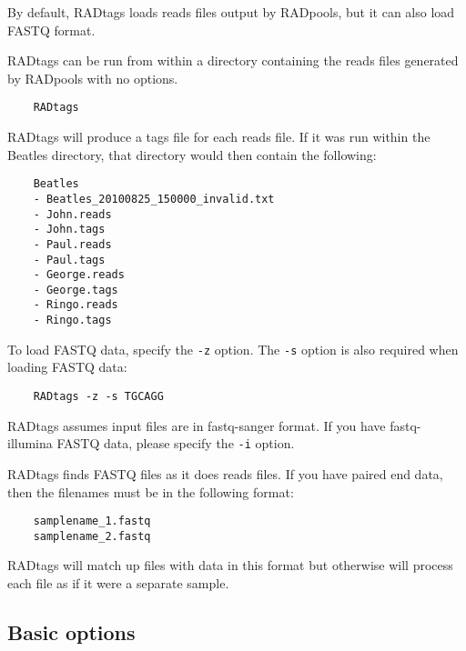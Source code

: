 \documentclass[a4paper]{article}
\begin{document}
By default, RADtags loads reads files output by RADpools, but it can also load FASTQ format.

RADtags can be run from within a directory containing the reads files generated by RADpools with no options.

\begin{verbatim}
    RADtags
\end{verbatim}

RADtags will produce a tags file for each reads file. If it was run within the Beatles directory, that directory would then contain the following:

\begin{verbatim}
    Beatles
    - Beatles_20100825_150000_invalid.txt
    - John.reads
    - John.tags
    - Paul.reads
    - Paul.tags
    - George.reads
    - George.tags
    - Ringo.reads
    - Ringo.tags
\end{verbatim}


To load FASTQ data, specify the \verb|-z| option. The \verb|-s| option is also required when loading FASTQ data:

\begin{verbatim}
    RADtags -z -s TGCAGG
\end{verbatim}

RADtags assumes input files are in fastq-sanger format. If you have fastq-illumina FASTQ data, please specify the \verb|-i| option.

RADtags finds FASTQ files as it does reads files. If you have paired end data, then the filenames must be in the following format:
\begin{verbatim}
    samplename_1.fastq
    samplename_2.fastq
\end{verbatim}

RADtags will match up files with data in this format but otherwise will process each file as if it were a separate sample.

\subsection{Basic options}
\end{document}
